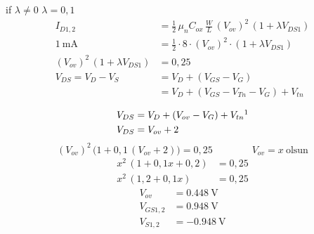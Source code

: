 \documentclass[11pt,a4paper]{article}
\begin{document}
if $\lambda \neq 0$ \qquad $\lambda = 0{,}1$
\begin{align*}
I_{D1,2} &= \frac{1}{2}\,\mu_n C_{ox}\,\frac{W}{L}\,(V_{ov})^2\,(1 + \lambda V_{DS1}) \\
\qty{1}{\milli\ampere} &= \frac{1}{2}\cdot 8\cdot (V_{ov})^2\cdot(1 + \lambda V_{DS1}) \\
(V_{ov})^2\,(1 + \lambda V_{DS1}) &= 0{,}25 \\
V_{DS} = V_D - V_S &= V_D + (V_{GS} - V_G) \\
&= V_D + (V_{GS} - V_{Tn} - V_G) + V_{tn}
\end{align*}

\begin{align*}
V_{DS} &= V_D + (V_{ov} - V_G) + V_{tn}\footnotemark \\
V_{DS} &= V_{ov} + 2
\end{align*}
\[ (V_{ov})^2\,\bigl(1 + 0{,}1\,(V_{ov} + 2)\bigr) = 0{,}25 \qquad\qquad V_{ov} = x \ \text{olsun} \]
\begin{align*}
x^2\,(1 + 0{,}1x + 0{,}2) &= 0{,}25 \\
x^2\,(1{,}2 + 0{,}1x) &= 0{,}25
\end{align*}
\begin{align*}
V_{ov} &= \qty{0,448}{\volt} \\
V_{GS1,2} &= \qty{0,948}{\volt} \\
V_{S1,2} &= \qty{-0,948}{\volt}
\end{align*}
\end{document}
